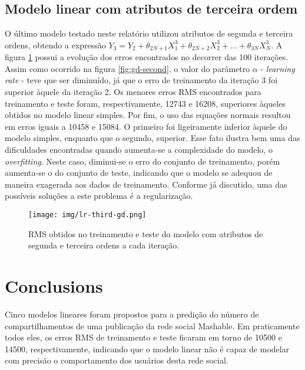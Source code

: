 \documentclass[10pt,twocolumn,letterpaper]{article}
\begin{document}
\subsection{Modelo linear com atributos de terceira ordem}

O último modelo testado neste relatório utilizou atributos de segunda e terceira ordens, obtendo a expressão \(Y_3 = Y_2 + \theta_{2N+1}X_1^3 + \theta_{2N+2}X_2^3 + \ldots + \theta_{3N}X_N^3\). A figura \ref{fig:gd-third} possui a evolução dos erros encontrados no decorrer das 100 iterações. Assim como ocorrido na figura \ref{fig:gd-second}, o valor do parâmetro \(\alpha\) - \textit{learning rate} - teve que ser diminuído, já que o erro de treinamento da iteração 3 foi superior àquele da iteração 2. Os menores erros RMS encontrados para treinamento e teste foram, respectivamente, 12743 e 16208, superiores àqueles obtidos no modelo linear simples. Por fim, o uso das equações normais resultou em erros iguais a 10458 e 15084. O primeiro foi ligeiramente inferior àquele do modelo simples, enquanto que o segundo, superior. Esse fato ilustra bem uma das dificuldades encontradas quando aumenta-se a complexidade do modelo, o \textit{overfitting}. Neste caso, diminui-se o erro do conjunto de treinamento, porém aumenta-se o do conjunto de teste, indicando que o modelo se adequou de maneira exagerada aos dados de treinamento. Conforme já discutido, uma das possíveis soluções a este problema é a regularização.

\begin{figure}
    \centering
    \texttt{[image: img/lr-third-gd.png]}
    \caption{RMS obtidos no treinamento e teste do modelo com atributos de segunda e terceira ordens a cada iteração.}
    \label{fig:gd-third}
\end{figure}

\section{Conclusions}

Cinco modelos lineares foram propostos para a predição do número de compartilhamentos de uma publicação da rede social Mashable. Em praticamente todos eles, os erros RMS de treinamento e teste ficaram em torno de 10500 e 14500, respectivamente, indicando que o modelo linear não é capaz de modelar com precisão o comportamento dos usuários desta rede social.

{\small


}
\end{document}
